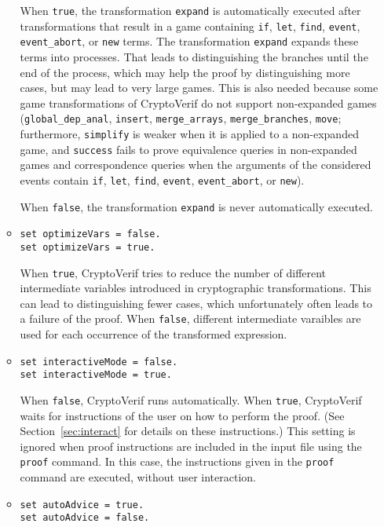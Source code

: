 \begin{itemize}
\begin{itemize}
When {\tt true}, the transformation \texttt{expand} is automatically
executed after transformations that result in a game containing
\texttt{if}, \texttt{let}, \texttt{find},
\texttt{event}, \texttt{event\_abort}, or \texttt{new} terms.
The transformation \texttt{expand} expands these terms into processes.
That leads to distinguishing the branches until the end of the process,
which may help the proof by distinguishing more cases, but
may lead to very large games.
This is also needed because some game transformations of CryptoVerif
do not support non-expanded games (\texttt{global\_dep\_anal},
\texttt{insert}, \texttt{merge\_arrays}, \texttt{merge\_branches}, \texttt{move};
furthermore, \texttt{simplify} is weaker when it is applied
to a non-expanded game, and \texttt{success} fails to prove
equivalence queries in non-expanded games and correspondence
queries when the arguments of the considered events contain
\texttt{if}, \texttt{let}, \texttt{find},
\texttt{event}, \texttt{event\_abort}, or \texttt{new}).

When {\tt false}, the transformation \texttt{expand} is never
automatically executed.

\item \texttt{set optimizeVars = false.}\\
\texttt{set optimizeVars = true.}

When {\tt true}, CryptoVerif tries to reduce the number of different
intermediate variables introduced in cryptographic
transformations. This can lead to distinguishing fewer cases,
which unfortunately often leads to a failure of the proof.
When {\tt false}, different intermediate varaibles are used for
each occurrence of the transformed expression.

\item \texttt{set interactiveMode = false.}\\
\texttt{set interactiveMode = true.}

When {\tt false}, CryptoVerif runs automatically.
When {\tt true}, CryptoVerif waits for instructions of the user
on how to perform the proof. (See Section~\ref{sec:interact}
for details on these instructions.)
%
This setting is ignored when proof instructions are included
in the input file using the \texttt{proof} command.
In this case, the instructions given in the \texttt{proof} command
are executed, without user interaction.

\item \texttt{set autoAdvice = true.}\\
\texttt{set autoAdvice = false.}


\end{itemize}
\end{itemize}
